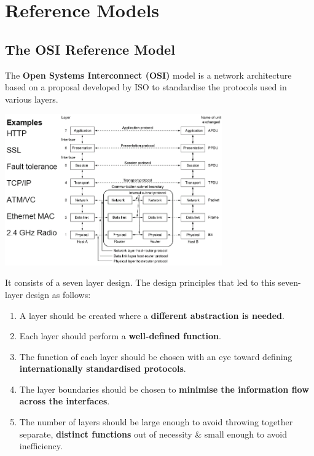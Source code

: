 \documentclass[11pt]{article}
\begin{document}
\newpage
\section{Reference Models}
\subsection{The OSI Reference Model}
The \textbf{Open Systems Interconnect (OSI)} model is a network architecture based on a proposal developed by ISO to standardise 
the protocols used in various layers. 

\begin{center}
    \includegraphics[width=0.7\textwidth]{osimodel.png}
\end{center}

It consists of a seven layer design. The design principles that led to this seven-layer design as follows:
\begin{enumerate}
    \item   A layer should be created where a \textbf{different abstraction is needed}. 
    \item   Each layer should perform a \textbf{well-defined function}. 
    \item   The function of each layer should be chosen with an eye toward defining \textbf{internationally standardised protocols}. 
    \item   The layer boundaries should be chosen to \textbf{minimise the information flow across the interfaces}. 
    \item   The number of layers should be large enough to avoid throwing together separate, \textbf{distinct functions} out of 
            necessity \& small enough to avoid inefficiency. 
\end{enumerate} 
\end{document}
